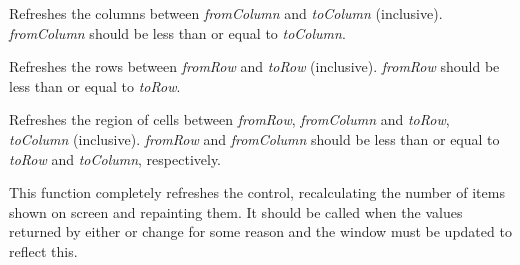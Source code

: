 


\label{wxhvscrolledwindowrefreshcolumns}


Refreshes the columns between {\it fromColumn} and {\it toColumn} (inclusive).
{\it fromColumn} should be less than or equal to {\it toColumn}.




\label{wxhvscrolledwindowrefreshrows}


Refreshes the rows between {\it fromRow} and {\it toRow} (inclusive).
{\it fromRow} should be less than or equal to {\it toRow}.




\label{wxhvscrolledwindowrefreshrowscolumns}


Refreshes the region of cells between {\it fromRow}, {\it fromColumn} and
{\it toRow}, {\it toColumn} (inclusive). {\it fromRow} and {\it fromColumn}
should be less than or equal to {\it toRow} and {\it toColumn}, respectively.




\label{wxhvscrolledwindowrefreshall}


This function completely refreshes the control, recalculating the number of
items shown on screen and repainting them. It should be called when the values
returned by either  or 
 change for some
reason and the window must be updated to reflect this.


